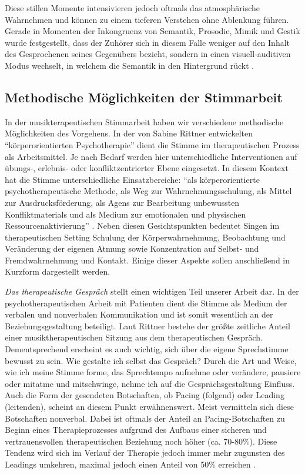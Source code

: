 Diese stillen Momente intensivieren jedoch oftmals das atmosphärische Wahrnehmen und können zu einem tieferen Verstehen ohne Ablenkung führen. 
Gerade in Momenten der Inkongruenz von Semantik, Prosodie, Mimik und Gestik wurde festgestellt, dass der Zuhörer sich in diesem Falle weniger auf den Inhalt des Gesprochenen seines Gegenübers bezieht, sondern in einen visuell-auditiven Modus wechselt, in welchem die Semantik in den Hintergrund rückt \autocite [vgl.][206f.]{rittner2008}.

\subsection{Methodische Möglichkeiten der Stimmarbeit}

In der musikterapeutischen Stimmarbeit haben wir verschiedene methodische Möglichkeiten des Vorgehens. In der von Sabine Rittner entwickelten "`körperorientierten Psychotherapie"' dient die Stimme im therapeutischen Prozess als Arbeitsmittel. Je nach Bedarf werden hier unterschiedliche Interventionen auf übungs-, erlebnis- oder konfliktzentrierter Ebene eingesetzt. In diesem Kontext hat die Stimme unterschiedliche Einsatzbereiche: "`als körperorientierte psychotherapeutische Methode, als Weg zur Wahrnehmungsschulung, als Mittel zur Ausdrucksförderung, als Agens zur Bearbeitung unbewussten Konfliktmaterials und als Medium zur emotionalen und physischen Ressourcenaktivierung"' \autocite[58]{rittner2012}. Neben diesen Gesichtspunkten bedeutet Singen im therapeutischen Setting Schulung der Körperwahrnehmung, Beobachtung und Veränderung der eigenen Atmung sowie Konzentration auf Selbst- und Fremdwahrnehmung und Kontakt.
Einige dieser Aspekte sollen anschließend in Kurzform dargestellt werden.

\emph{Das therapeutische Gespräch} stellt einen wichtigen Teil unserer Arbeit dar. In der psychotherapeutischen Arbeit mit Patienten dient die Stimme als Medium der verbalen und nonverbalen Kommunikation und ist somit wesentlich an der Beziehungsgestaltung beteiligt. Laut Rittner bestehe der größte zeitliche Anteil einer musiktherapeutischen Sitzung aus dem therapeutischen Gespräch. Dementsprechend erscheint es auch wichtig, sich über die eigene Sprechstimme bewusst zu sein. Wie gestalte ich selbst das Gespräch? Durch die Art und Weise, wie ich meine Stimme forme, das Sprechtempo aufnehme oder verändere, pausiere oder mitatme und mitschwinge, nehme ich auf die Gesprächsgestaltung Einfluss. Auch die Form der gesendeten Botschaften, ob Pacing (folgend) oder Leading (leitenden), scheint an diesem Punkt erwähnenswert. Meist vermitteln sich diese Botschaften nonverbal. Dabei ist oftmals der Anteil an Pacing-Botschaften zu Beginn eines Therapieprozesses aufgrund des Aufbaus einer sicheren und vertrauensvollen therapeutischen Beziehung noch höher (ca. 70-80\%). Diese Tendenz wird sich im Verlauf der Therapie jedoch immer mehr zugunsten des Leadings umkehren, maximal jedoch einen Anteil von 50\% erreichen \autocite[vgl.][208]{rittner2008}.

